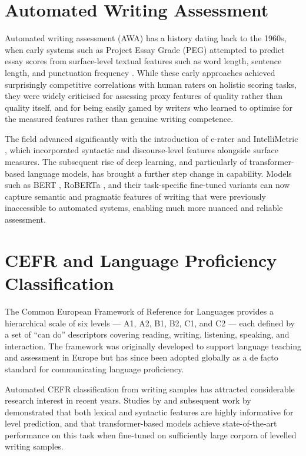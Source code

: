 \documentclass[12pt, a4paper]{report}
\begin{document}
\section{Automated Writing Assessment}

Automated writing assessment (AWA) has a history dating back to the 1960s, when early systems such as Project Essay Grade (PEG) attempted to predict essay scores from surface-level textual features such as word length, sentence length, and punctuation frequency \cite{page1966}. While these early approaches achieved surprisingly competitive correlations with human raters on holistic scoring tasks, they were widely criticised for assessing proxy features of quality rather than quality itself, and for being easily gamed by writers who learned to optimise for the measured features rather than genuine writing competence.

The field advanced significantly with the introduction of e-rater \cite{burstein2003} and IntelliMetric \cite{rudner2006}, which incorporated syntactic and discourse-level features alongside surface measures. The subsequent rise of deep learning, and particularly of transformer-based language models, has brought a further step change in capability. Models such as BERT \cite{devlin2019}, RoBERTa \cite{liu2019}, and their task-specific fine-tuned variants can now capture semantic and pragmatic features of writing that were previously inaccessible to automated systems, enabling much more nuanced and reliable assessment.

\section{CEFR and Language Proficiency Classification}

The Common European Framework of Reference for Languages \cite{council2001} provides a hierarchical scale of six levels — A1, A2, B1, B2, C1, and C2 — each defined by a set of ``can do'' descriptors covering reading, writing, listening, speaking, and interaction. The framework was originally developed to support language teaching and assessment in Europe but has since been adopted globally as a de facto standard for communicating language proficiency.

Automated CEFR classification from writing samples has attracted considerable research interest in recent years. Studies by \citeauthor{yannakoudakis2011} \cite{yannakoudakis2011} and subsequent work by \citeauthor{vajjala2018} \cite{vajjala2018} demonstrated that both lexical and syntactic features are highly informative for level prediction, and that transformer-based models achieve state-of-the-art performance on this task when fine-tuned on sufficiently large corpora of levelled writing samples.
\end{document}
